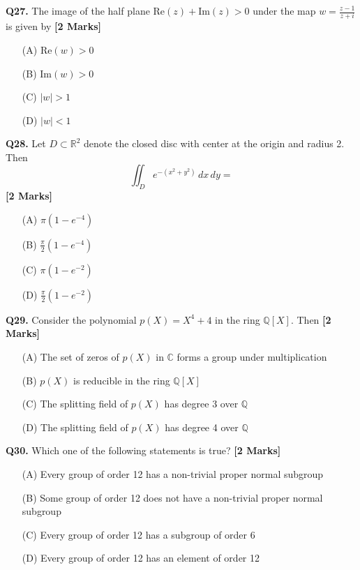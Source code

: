 \documentclass[11pt]{article}
\newcommand{\questionb}[2]{
    \noindent\textbf{Q#2.} #1 \hfill \textbf{[2 Marks]}
}
\begin{document}
\questionb{The image of the half plane \( \text{Re}(z) + \text{Im}(z) > 0 \) under the map \( w = \frac{z - 1}{z + i} \) is given by}{27}
\begin{enumerate}
    \item[(A)] \( \text{Re}(w) > 0 \)
    \item[(B)] \( \text{Im}(w) > 0 \)
    \item[(C)] \( |w| > 1 \)
    \item[(D)] \( |w| < 1 \)
\end{enumerate}
\vspace{0.5cm}

\questionb{Let \( D \subset \mathbb{R}^2 \) denote the closed disc with center at the origin and radius 2. Then \[
\iint_D e^{-(x^2 + y^2)} \, dx\, dy =
\]}{28}
\begin{enumerate}
    \item[(A)] \( \pi (1 - e^{-4}) \)
    \item[(B)] \( \frac{\pi}{2} (1 - e^{-4}) \)
    \item[(C)] \( \pi (1 - e^{-2}) \)
    \item[(D)] \( \frac{\pi}{2} (1 - e^{-2}) \)
\end{enumerate}
\vspace{0.5cm}

\questionb{Consider the polynomial \( p(X) = X^4 + 4 \) in the ring \( \mathbb{Q}[X] \). Then}{29}
\begin{enumerate}
    \item[(A)] The set of zeros of \( p(X) \) in \( \mathbb{C} \) forms a group under multiplication
    \item[(B)] \( p(X) \) is reducible in the ring \( \mathbb{Q}[X] \)
    \item[(C)] The splitting field of \( p(X) \) has degree 3 over \( \mathbb{Q} \)
    \item[(D)] The splitting field of \( p(X) \) has degree 4 over \( \mathbb{Q} \)
\end{enumerate}
\vspace{0.5cm}

\questionb{Which one of the following statements is true?}{30}
\begin{enumerate}
    \item[(A)] Every group of order 12 has a non-trivial proper normal subgroup
    \item[(B)] Some group of order 12 does not have a non-trivial proper normal subgroup
    \item[(C)] Every group of order 12 has a subgroup of order 6
    \item[(D)] Every group of order 12 has an element of order 12
\end{enumerate}
\vspace{0.5cm}
\end{document}
